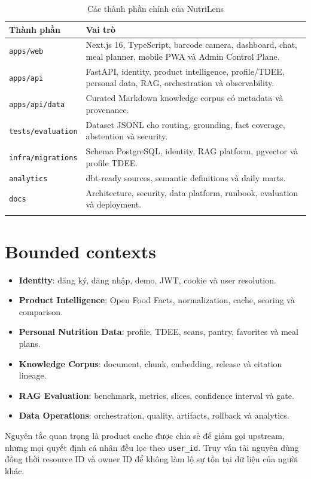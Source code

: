 \documentclass[12pt,a4paper]{report}
\newcommand{\code}[1]{\texttt{#1}}
\begin{document}
\begin{longtable}{p{}p{}}
\toprule
\textbf{Thành phần} & \textbf{Vai trò}\\
\midrule
\endhead
\code{apps/web} & Next.js 16, TypeScript, barcode camera, dashboard, chat, meal planner, mobile PWA và Admin Control Plane.\\
\code{apps/api} & FastAPI, identity, product intelligence, profile/TDEE, personal data, RAG, orchestration và observability.\\
\code{apps/api/data} & Curated Markdown knowledge corpus có metadata và provenance.\\
\code{tests/evaluation} & Dataset JSONL cho routing, grounding, fact coverage, abstention và security.\\
\code{infra/migrations} & Schema PostgreSQL, identity, RAG platform, pgvector và profile TDEE.\\
\code{analytics} & dbt-ready sources, semantic definitions và daily marts.\\
\code{docs} & Architecture, security, data platform, runbook, evaluation và deployment.\\
\bottomrule
\caption{Các thành phần chính của NutriLens}
\end{longtable}

\section{Bounded contexts}

\begin{itemize}
  \item \textbf{Identity}: đăng ký, đăng nhập, demo, JWT, cookie và user resolution.
  \item \textbf{Product Intelligence}: Open Food Facts, normalization, cache, scoring và comparison.
  \item \textbf{Personal Nutrition Data}: profile, TDEE, scans, pantry, favorites và meal plans.
  \item \textbf{Knowledge Corpus}: document, chunk, embedding, release và citation lineage.
  \item \textbf{RAG Evaluation}: benchmark, metrics, slices, confidence interval và gate.
  \item \textbf{Data Operations}: orchestration, quality, artifacts, rollback và analytics.
\end{itemize}

Nguyên tắc quan trọng là product cache được chia sẻ để giảm gọi upstream,
nhưng mọi quyết định cá nhân đều lọc theo \code{user\_id}. Truy vấn tài nguyên
dùng đồng thời resource ID và owner ID để không làm lộ sự tồn tại dữ liệu của
người khác.
\end{document}
